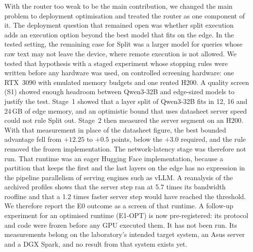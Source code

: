 \documentclass[lettersize,journal]{IEEEtran}
\begin{document}
With the router too weak to be the main contribution, we changed the main problem to deployment optimisation and treated the router as one component of it. The deployment question that remained open was whether split execution adds an execution option beyond the best model that fits on the edge. In the tested setting, the remaining case for Split was a larger model for queries whose raw text may not leave the device, where remote execution is not allowed. We tested that hypothesis with a staged experiment whose stopping rules were written before any hardware was used, on controlled screening hardware: one RTX~3090 with emulated memory budgets and one rented H200. A quality screen (S1) showed enough headroom between Qwen3-32B and edge-sized models to justify the test. Stage~1 showed that a layer split of Qwen3-32B fits in 12, 16 and 24\,GB of edge memory, and an optimistic bound that uses datasheet server speed could not rule Split out. Stage~2 then measured the server segment on an H200. With that measurement in place of the datasheet figure, the best bounded advantage fell from $+12.25$ to $+0.5$ points, below the $+3.0$ required, and the rule removed the frozen implementation. The network-latency stage was therefore not run. That runtime was an eager Hugging Face implementation, because a partition that keeps the first and the last layers on the edge has no expression in the pipeline parallelism of serving engines such as vLLM. A reanalysis of the archived profiles shows that the server step ran at 5.7 times its bandwidth roofline and that a 1.2 times faster server step would have reached the threshold. We therefore report the E0 outcome as a screen of that runtime. A follow-up experiment for an optimised runtime (E1-OPT) is now pre-registered: its protocol and code were frozen before any GPU executed them. It has not been run. Its measurements belong on the laboratory's intended target system, an Asus server and a DGX Spark, and no result from that system exists yet.
\end{document}
